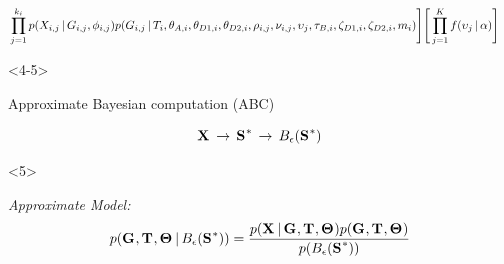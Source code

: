 \begin{frame}[t]
\begin{onlyenv}
\begin{displaybox}
{\begin{equation*}
\begin{split}
        &
        \prod_{j=1}^{\nloci{i}}
        p(\alignment{i}{j} \given
        \geneTree{i}{j}, \hkyModel{i}{j})
        p(\geneTree{i}{j} \given
        \divTimeMap{i},
        \ancestralTheta{i}, \descendantTheta{1}{i}, \descendantTheta{2}{i},
        \ploidyScalar{i}{j}, \mutationRateScalarConstant{i}{j},
        \locusMutationRateScalar{j},
        \bottleTime{i}, \bottleScalar{1}{i}, \bottleScalar{2}{i},
        \migrationRate{i})
        \Bigg]
        \Bigg[
        \prod_{j=1}^{\nlociTotal}
        f(\locusMutationRateScalar{j} \given \locusRateHetShapeParameter)
        \Bigg]
        \label{eq:fullmodel}
        \end{split}
    \end{equation*}
    }
    \end{displaybox}
    \end{onlyenv}
    \begin{onlyenv}<4-5>
    \smallskip
        \centerline{Approximate Bayesian computation (ABC)}
        \[ \alignmentVector \, \to \, \ssVectorObs \, \to \, \ssSpace\]
    \end{onlyenv}
    \begin{onlyenv}<5>
    \begin{block}{\it Approximate Model:}
    \[
        p(\geneTreeVector, \divTimeMapVector, \demographicParamVector
        \given
        \ssSpace) =
        \frac{p(\alignmentVector \given \geneTreeVector, \divTimeMapVector,
        \demographicParamVector)
        p(\geneTreeVector, \divTimeMapVector, \demographicParamVector)}{
        p(\ssSpace)}
    \]\vspace{0mm}
    \end{block}
    \end{onlyenv}
\end{frame}


